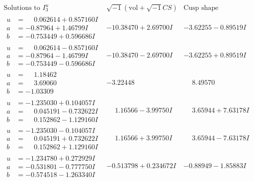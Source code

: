 \documentclass[1p]{elsarticle_modified}
\theoremstyle{definition}
\newcommand{\I}{\sqrt{-1}}
\begin{document}
$$\begin{array}{c|c|c}  
\text{Solutions to }I^u_{3}& \I (\text{vol} + \sqrt{-1}CS) & \text{Cusp shape}\\
 \hline 
\begin{aligned}
u &= \phantom{-}0.062614 + 0.857160 I \\
a &= -0.87964 + 1.46799 I \\
b &= -0.753449 + 0.596686 I\end{aligned}
 & -10.38470 + 2.69700 I & -3.62255 - 0.89519 I \\ \hline\begin{aligned}
u &= \phantom{-}0.062614 - 0.857160 I \\
a &= -0.87964 - 1.46799 I \\
b &= -0.753449 - 0.596686 I\end{aligned}
 & -10.38470 - 2.69700 I & -3.62255 + 0.89519 I \\ \hline\begin{aligned}
u &= \phantom{-}1.18462\phantom{ +0.000000I} \\
a &= \phantom{-}3.69060\phantom{ +0.000000I} \\
b &= -1.03309\phantom{ +0.000000I}\end{aligned}
 & -3.22448\phantom{ +0.000000I} & \phantom{-}8.49570\phantom{ +0.000000I} \\ \hline\begin{aligned}
u &= -1.235030 + 0.104057 I \\
a &= \phantom{-}0.045191 - 0.732622 I \\
b &= \phantom{-}0.152862 - 1.129160 I\end{aligned}
 & \phantom{-}1.16566 - 3.99750 I & \phantom{-}3.65944 + 7.63178 I \\ \hline\begin{aligned}
u &= -1.235030 - 0.104057 I \\
a &= \phantom{-}0.045191 + 0.732622 I \\
b &= \phantom{-}0.152862 + 1.129160 I\end{aligned}
 & \phantom{-}1.16566 + 3.99750 I & \phantom{-}3.65944 - 7.63178 I \\ \hline\begin{aligned}
u &= -1.234780 + 0.272929 I \\
a &= -0.531801 - 0.777750 I \\
b &= -0.574518 - 1.263340 I\end{aligned}
 & -0.513798 + 0.234672 I & -0.88949 - 1.85883 I \\ \hline\begin{aligned}

\end{aligned}
\end{array}$$
\end{document}
